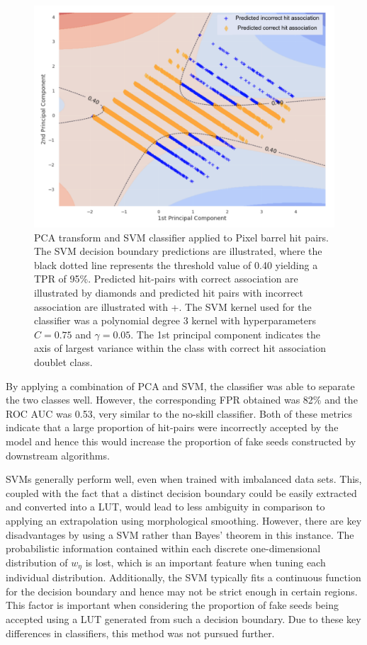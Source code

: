 \begin{figure}[htbp]
\centering
\includegraphics[width=0.85\linewidth]{images/4-ml-based-predictor/barrel-svm-pca.png}
\caption{PCA transform and SVM classifier applied to Pixel barrel hit pairs. The SVM decision boundary predictions are illustrated, where the black dotted line represents the threshold value of 0.40 yielding a TPR of 95\%. Predicted hit-pairs with correct association are illustrated by diamonds and predicted hit pairs with incorrect association are illustrated with +. The SVM kernel used for the classifier was a polynomial degree 3 kernel with hyperparameters $C=0.75$ and $\gamma=0.05$. The 1st principal component indicates the axis of largest variance within the class with correct hit association doublet class.}
\label{fig:barrel-svm-pca}
\end{figure}

By applying a combination of PCA and SVM, the classifier was able to separate the two classes well. However, the corresponding FPR obtained was 82\% and the ROC AUC was 0.53, very similar to the no-skill classifier. Both of these metrics indicate that a large proportion of hit-pairs were incorrectly accepted by the model and hence this would increase the proportion of fake seeds constructed by downstream algorithms.

SVMs generally perform well, even when trained with imbalanced data sets. This, coupled with the fact that a distinct decision boundary could be easily extracted and converted into a LUT, would lead to less ambiguity in comparison to applying an extrapolation using morphological smoothing. However, there are key disadvantages by using a SVM rather than Bayes' theorem in this instance. The probabilistic information contained within each discrete one-dimensional distribution of $w_{\eta}$ is lost, which is an important feature when tuning each individual distribution. Additionally, the SVM typically fits a continuous function for the decision boundary and hence may not be strict enough in certain regions. This factor is important when considering the proportion of fake seeds being accepted using a LUT generated from such a decision boundary. Due to these key differences in classifiers, this method was not pursued further.


